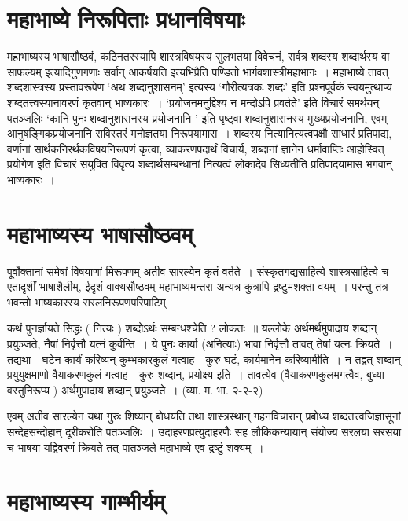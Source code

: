 {\section*{महाभाष्ये निरूपिताः प्रधानविषयाः}

महाभाष्यस्य भाषासौष्ठवं, कठिनतरस्यापि शास्त्रविषयस्य सुलभतया विवेचनं, सर्वत्र शब्दस्य शब्दार्थस्य वा साफल्यम् इत्यादिगुणगणाः सर्वान् आकर्षयति इत्यभिप्रैति पण्डितो भार्गवशास्त्रीमहाभागः~। महाभाष्ये तावत् शब्दशास्त्रस्य प्रस्तावरूपेण ‘अथ शब्दानुशासनम्’ इत्यस्य ‘गौरीत्यत्रकः शब्दः’ इति प्रश्नपूर्वकं स्वयमुत्थाप्य शब्दतत्त्वस्यानावरणं कृतवान् भाष्यकारः~। ‘प्रयोजनमनुद्दिश्य न मन्दोऽपि प्रवर्तते’ इति विचारं समर्थयन् पतञ्जलिः ‘कानि पुनः शब्दानुशासनस्य प्रयोजनानि ’ इति पृष्ट्वा शब्दानुशासनस्य मुख्यप्रयोजनानि, एवम् आनुषङ्गिकप्रयोजनानि सविस्तरं मनोज्ञतया निरूपयामास~। शब्दस्य नित्यानित्यत्वपक्षौ साधारं प्रतिपाद्य, वर्णानां सार्थकनिरर्थकविषयनिरूपणं कृत्वा, व्याकरणपदार्थं विचार्य, शब्दानां ज्ञानेन धर्मावाप्तिः आहोस्वित् प्रयोगेण इति विचारं सयुक्ति विवृत्य शब्दार्थसम्बन्धानां नित्यत्वं लोकादेव सिध्यतीति प्रतिपादयामास भगवान् भाष्यकारः~। 

\section*{महाभाष्यस्य भाषासौष्ठवम्}

पूर्वोक्तानां समेषां विषयाणां मिरूपणम् अतीव सारल्येन कृतं वर्तते~। संस्कृतगद्यसाहित्ये शास्त्रसाहित्ये च एतादृशीं भाषाशैलीम्, ईदृशं वाक्यसौष्ठवम् महाभाष्यमन्तरा अन्यत्र कुत्रापि द्रष्टुमशक्ता वयम्~। परन्तु तत्र भवन्तो भाष्यकारस्य सरलनिरूपणपरिपाटिम्

कथं पुनर्ज्ञायते सिद्धः ( नित्यः ) शब्दोऽर्थः सम्बन्धश्चेति ? लोकतः~॥ यल्लोके अर्थमर्थमुपादाय शब्दान् प्रयुञ्जते, नैषां निर्वृत्तौ यत्नं कुर्वन्ति~। ये पुनः कार्या (अनित्याः) भावा निर्वृत्तौ तावत् तेषां यत्नः क्रियते~। तद्यथा - घटेन कार्यं करिष्यन् कुम्भकारकुलं गत्वाह - कुरु घटं, कार्यमानेन करिष्यामीति~। न तद्वत् शब्दान् प्रयुयुक्षमाणो वैयाकरणकुलं गत्वाह - कुरु शब्दान्, प्रयोक्ष्य इति~। तावत्येव (वैयाकरणकुलमगत्वैव, बुध्या वस्तुनिरूप्य ) अर्थमुपादाय शब्दान् प्रयुञ्जते~। (व्या. म. भा. २-२-२)

एवम् अतीव सारल्येन यथा गुरुः शिष्यान् बोधयति तथा शास्त्रस्थान् गहनविचारान् प्रबोध्य शब्दतत्त्वजिज्ञासूनां सन्देहसन्दोहान् दूरीकरोति पतञ्जलिः~। उदाहरणप्रत्युदाहरणैः सह लौकिकन्यायान् संयोज्य सरलया सरसया च भाषया यद्विवरणं क्रियते तत् पातञ्जले महाभाष्ये एव द्रष्टुं शक्यम्~। 

\section*{महाभाष्यस्य गाम्भीर्यम्}

}
